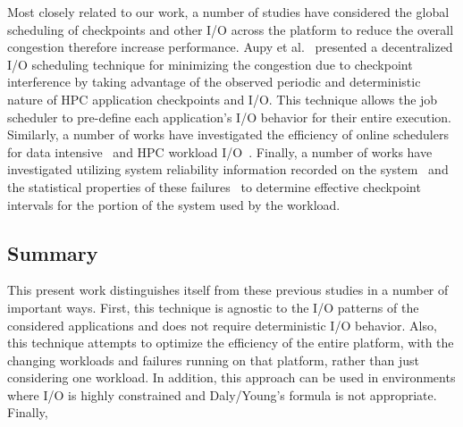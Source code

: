 Most closely related to our work, a number of studies have considered the
global scheduling of checkpoints and other I/O across the platform to reduce
the overall congestion therefore increase performance.  Aupy et
al.~\cite{Aupy:2017:Periodic} presented a decentralized I/O scheduling
technique for minimizing the congestion due to checkpoint interference by
taking advantage of the observed periodic and deterministic nature of HPC
application checkpoints and I/O.  This technique allows the job scheduler to
pre-define each application’s I/O behavior for their entire execution.
Similarly, a number of works have investigated the efficiency of online
schedulers for data intensive~\cite{Groot2013,Sim:2015:AnalyzeThis} and HPC
workload
I/O~\cite{Dorier2015,Gainaru:2016:Scheduling,Zhou:2015:IOAware,Herbein2017}.
Finally, a number of works have investigated utilizing system reliability
information recorded on the system~\cite{Oliner:2006:Cooperative} and the
statistical properties of these failures~\cite{Tiwari:2014:Lazy} to determine
effective checkpoint intervals for the portion of the system used by the
workload.

\subsection{Summary}

This present work distinguishes itself from these previous studies in a number
of important ways.  First, this technique is agnostic to the I/O patterns of
the considered applications and does not require deterministic I/O behavior.
Also, this technique attempts to optimize the efficiency of the entire
platform, with the changing workloads and failures running on that platform,
rather than just considering one workload. In addition, this approach can be
used in environments where I/O is highly constrained and Daly/Young's formula
is not appropriate.  Finally, 
